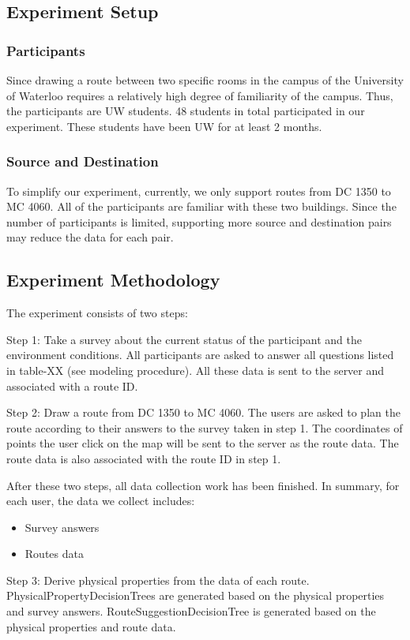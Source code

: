 \documentclass{sigchi}
\begin{document}
\subsection{Experiment Setup}
\subsubsection{Participants}
Since drawing a route between two specific rooms in the campus of the University of Waterloo requires a relatively high degree of familiarity of the campus. Thus, the participants are UW students. 48 students in total participated in our experiment. These students have been UW for at least 2 months.
\subsubsection{ Source and Destination}
To simplify our experiment, currently, we only support routes from DC 1350 to MC 4060. All of the participants are familiar with these two buildings. Since the number of participants is limited, supporting more source and destination pairs may reduce the data for each pair.

\subsection{Experiment Methodology}

The experiment consists of two steps:


Step 1: Take a survey about the current status of the participant and the environment conditions. All participants are asked to answer all questions listed in table-XX (see modeling procedure). All these data is sent to the server and associated with a route ID.


Step 2: Draw a route from DC 1350 to MC 4060. The users are asked to plan the route according to their answers to the survey taken in step 1. The coordinates of points the user click on the map will be sent to the server as the route data. The route data is also associated with the route ID in step 1.


After these two steps, all data collection work has been finished. In summary, for each user, the data we collect includes:
\begin{itemize}
\item Survey answers
\item Routes data
\end{itemize}

Step 3: Derive physical properties from the data of each route. PhysicalPropertyDecisionTrees are generated based on the physical properties and survey answers. RouteSuggestionDecisionTree is generated based on the physical properties and route data.
\end{document}
